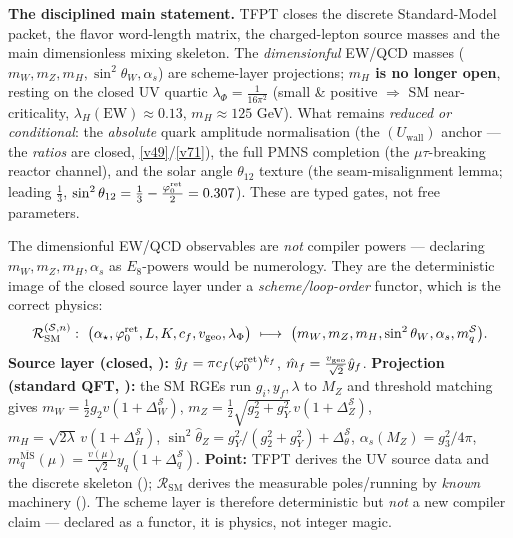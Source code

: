 \par\smallskip\noindent\textbf{The disciplined main statement.}
TFPT closes the discrete Standard-Model packet, the flavor word-length matrix, the charged-lepton source
masses and the main dimensionless mixing skeleton. The \emph{dimensionful} EW/QCD masses
($m_W,m_Z,m_H,\sin^2\theta_W,\alpha_s$) are scheme-layer projections; \textbf{$m_H$ is no longer open},
resting on the closed UV quartic $\lambda_\Phi{=}\tfrac1{16\pi^2}$ (small \& positive $\Rightarrow$ SM
near-criticality, $\lambda_H(\mathrm{EW})\!\approx\!0.13$, $m_H\!\approx\!125$ GeV). What remains
\emph{reduced or conditional}: the \emph{absolute} quark amplitude normalisation (the $(U_{\mathrm{wall}})$
anchor --- the \emph{ratios} are closed, \vref{v49}/\vref{v71}), the
full PMNS completion (the $\mu\tau$-breaking reactor channel), and the solar angle $\theta_{12}$ texture
(the seam-misalignment lemma; leading $\tfrac13$, $\sin^2\theta_{12}=\tfrac13-\tfrac{\varphi_0^{\mathrm{ret}}}2=0.307$). These
are typed gates, not free parameters.

\begin{keybox}
The dimensionful EW/QCD observables are \emph{not} compiler powers --- declaring $m_W,m_Z,m_H,\alpha_s$ as
$E_8$-powers would be numerology. They are the deterministic image of the closed source layer under a
\emph{scheme/loop-order} functor, which is the correct physics:
\[
  \mathcal R_{\mathrm{SM}}^{(\mathcal S,n)}:\ 
  \bigl(\alpha_\star,\phiz,L,K,c_f,v_{\mathrm{geo}},\lambda_\Phi\bigr)\ \longmapsto\
  \bigl(m_W,m_Z,m_H,\sin^2\theta_W,\alpha_s,m_q^{\mathcal S}\bigr).
\]
\textbf{Source layer (closed, \mE):} $\hat y_f=\pi c_f(\varphi_0^{\mathrm{ret}})^{k_f}$, $\hat m_f=\tfrac{v_{\mathrm{geo}}}{\sqrt2}\hat y_f$.
\textbf{Projection (standard QFT, \mC):} the SM RGEs run $g_i,y_f,\lambda$ to $M_Z$ and threshold matching
gives $m_W=\tfrac12 g_2 v(1{+}\Delta_W^{\mathcal S})$, $m_Z=\tfrac12\sqrt{g_2^2{+}g_Y^2}\,v(1{+}\Delta_Z^{\mathcal S})$,
$m_H=\sqrt{2\lambda}\,v(1{+}\Delta_H^{\mathcal S})$, $\sin^2\hat\theta_Z=g_Y^2/(g_2^2{+}g_Y^2)+\Delta_\theta^{\mathcal S}$,
$\alpha_s(M_Z)=g_3^2/4\pi$, $m_q^{\overline{\mathrm{MS}}}(\mu)=\tfrac{v(\mu)}{\sqrt2}y_q(1{+}\Delta_q^{\mathcal S})$.
\textbf{Point:} TFPT derives the UV source data and the discrete skeleton (\mE); $\mathcal R_{\mathrm{SM}}$
derives the measurable poles/running by \emph{known} machinery (\mC). The scheme layer is therefore
deterministic but \emph{not} a new compiler claim --- declared as a functor, it is physics, not integer magic.
\end{keybox}

